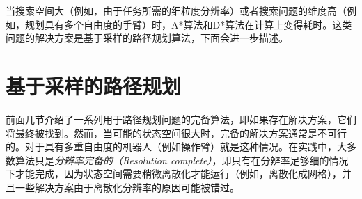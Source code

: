 
当搜索空间大（例如，由于任务所需的细粒度分辨率）或者搜索问题的维度高（例如，规划具有多个自由度的手臂）时，A*算法和D*算法在计算上变得耗时。这类问题的解决方案是基于采样的路径规划算法，下面会进一步描述。

\section{基于采样的路径规划}


前面几节介绍了一系列用于路径规划问题的完备算法，即如果存在解决方案，它们将最终被找到。然而，当可能的状态空间很大时，完备的解决方案通常是不可行的。对于具有多重自由度的机器人（例如操作臂）就是这种情况。在实践中，大多数算法只是\emph{分辨率完备的（Resolution complete）}，即只有在分辨率足够细的情况下才能完成，因为状态空间需要稍微离散化才能运行（例如，离散化成网格），并且一些解决方案由于离散化分辨率的原因可能被错过。


